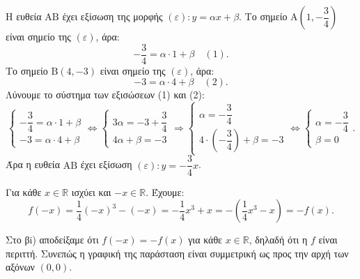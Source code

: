 \begin{alist}
\item Η ευθεία $\text{AB}$ έχει εξίσωση της μορφής $(\varepsilon): y = \alpha x + \beta$. Το σημείο $\text{A}\left(1, -\dfrac{3}{4}\right)$ είναι σημείο της $(\varepsilon)$, άρα:
\[-\frac{3}{4} = \alpha\cdot 1 + \beta \quad (1).\]
Το σημείο $\text{B}(4, -3)$ είναι σημείο της $(\varepsilon)$, άρα:
\[-3 = \alpha\cdot 4 + \beta \quad (2).\]
Λύνουμε το σύστημα των εξισώσεων (1) και (2):
\[\begin{cases} -\dfrac{3}{4} = \alpha\cdot 1 + \beta \\ -3 = \alpha\cdot 4 + \beta \end{cases} \Leftrightarrow \begin{cases} 3\alpha = -3 + \dfrac{3}{4} \\ 4\alpha + \beta = -3 \end{cases} \Rightarrow \begin{cases} \alpha = -\dfrac{3}{4} \\ 4\cdot\left(-\dfrac{3}{4}\right) + \beta = -3 \end{cases} \Leftrightarrow \begin{cases} \alpha = -\dfrac{3}{4} \\ \beta = 0 \end{cases}.\]
Άρα η ευθεία $\text{AB}$ έχει εξίσωση $(\varepsilon): y = -\dfrac{3}{4}x$.
\item 
\begin{rlist}
\item Για κάθε $x \in \mathbb{R}$ ισχύει και $-x \in \mathbb{R}$. Έχουμε:
\[f(-x) = \frac{1}{4}(-x)^3 - (-x) = -\frac{1}{4}x^3 + x = -\left(\frac{1}{4}x^3 - x\right) = -f(x).\]
\item Στο βi) αποδείξαμε ότι $f(-x) = -f(x)$ για κάθε $x \in \mathbb{R}$, δηλαδή ότι η $f$ είναι περιττή. 
Συνεπώς η γραφική της παράσταση είναι συμμετρική ως προς την αρχή των αξόνων $(0,0)$.
\end{rlist}
\end{alist}
\begin{center}
\end{center}

